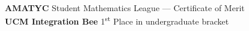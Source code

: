 \documentclass[./Resume.tex]{subfiles}
\begin{document}
    \\{\bfseries AMATYC} Student Mathematics League --- Certificate of Merit\\
    {\bfseries UCM Integration Bee} 1\textsuperscript{st} Place in undergraduate bracket
    \vspace*{-2mm}
\end{document}
